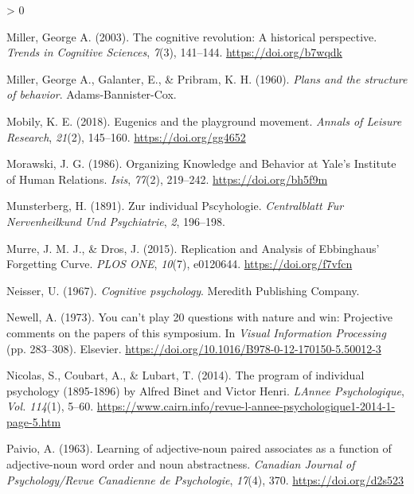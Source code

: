 \documentclass[
  oneside,
  12pt]{crumpbook}
\newlength{\cslhangindent}
\newenvironment{CSLReferences}[2] %
 {%
  \setlength{\parindent}{0pt}
  \ifodd #1 \everypar{\setlength{\hangindent}{\cslhangindent}}\ignorespaces\fi
  \ifnum #2 > 0
  \setlength{\parskip}{#2\baselineskip}
  \fi
 }%
 {}
\begin{document}
\begin{CSLReferences}{1}{0}
\leavevmode\hypertarget{ref-millerCognitiveRevolutionHistorical2003}{}%
Miller, George A. (2003). The cognitive revolution: A historical perspective. \emph{Trends in Cognitive Sciences}, \emph{7}(3), 141--144. \url{https://doi.org/b7wqdk}

\leavevmode\hypertarget{ref-millerPlansStructureBehavior1960}{}%
Miller, George A., Galanter, E., \& Pribram, K. H. (1960). \emph{Plans and the structure of behavior}. {Adams-Bannister-Cox}.

\leavevmode\hypertarget{ref-mobilyEugenicsPlaygroundMovement2018}{}%
Mobily, K. E. (2018). Eugenics and the playground movement. \emph{Annals of Leisure Research}, \emph{21}(2), 145--160. \url{https://doi.org/gg4652}

\leavevmode\hypertarget{ref-morawskiOrganizingKnowledgeBehavior1986}{}%
Morawski, J. G. (1986). Organizing {Knowledge} and {Behavior} at {Yale}'s {Institute} of {Human Relations}. \emph{Isis}, \emph{77}(2), 219--242. \url{https://doi.org/bh5f9m}

\leavevmode\hypertarget{ref-munsterbergZurIndividualPscyhologie1891}{}%
Munsterberg, H. (1891). Zur individual {Pscyhologie}. \emph{Centralblatt Fur Nervenheilkund Und Psychiatrie}, \emph{2}, 196--198.

\leavevmode\hypertarget{ref-murreReplicationAnalysisEbbinghaus2015}{}%
Murre, J. M. J., \& Dros, J. (2015). Replication and {Analysis} of {Ebbinghaus}' {Forgetting Curve}. \emph{PLOS ONE}, \emph{10}(7), e0120644. \url{https://doi.org/f7vfcn}

\leavevmode\hypertarget{ref-neisserCognitivePsychology1967}{}%
Neisser, U. (1967). \emph{Cognitive psychology}. {Meredith Publishing Company}.

\leavevmode\hypertarget{ref-newellYouCanPlay1973}{}%
Newell, A. (1973). You can't play 20 questions with nature and win: {Projective} comments on the papers of this symposium. In \emph{Visual {Information Processing}} (pp. 283--308). {Elsevier}. \url{https://doi.org/10.1016/B978-0-12-170150-5.50012-3}

\leavevmode\hypertarget{ref-nicolasProgramIndividualPsychology2014}{}%
Nicolas, S., Coubart, A., \& Lubart, T. (2014). The program of individual psychology (1895-1896) by {Alfred Binet} and {Victor Henri}. \emph{LAnnee Psychologique}, \emph{Vol. 114}(1), 5--60. \url{https://www.cairn.info/revue-l-annee-psychologique1-2014-1-page-5.htm}

\leavevmode\hypertarget{ref-paivioLearningAdjectivenounPaired1963}{}%
Paivio, A. (1963). Learning of adjective-noun paired associates as a function of adjective-noun word order and noun abstractness. \emph{Canadian Journal of Psychology/Revue Canadienne de Psychologie}, \emph{17}(4), 370. \url{https://doi.org/d2s523}


\end{CSLReferences}
\end{document}
